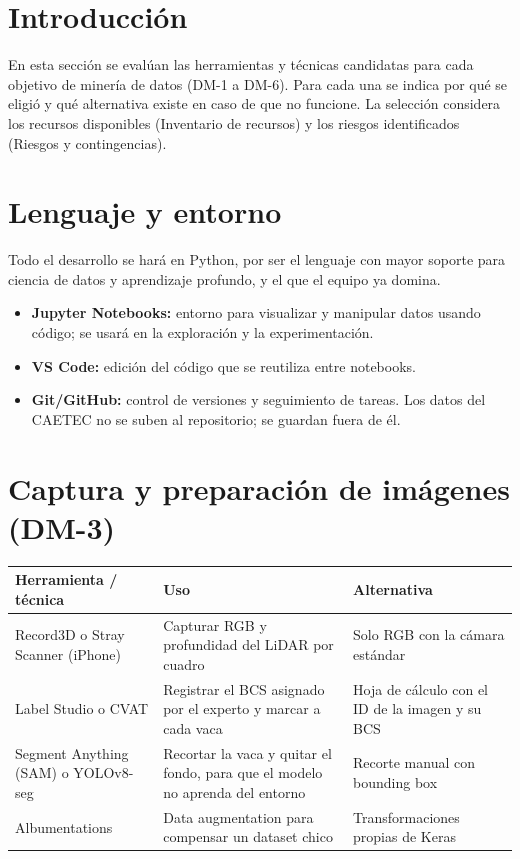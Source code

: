 \documentclass[11pt,letterpaper,DIV=12]{scrartcl}
\begin{document}


\section{Introducción}

En esta sección se evalúan las herramientas y técnicas candidatas para cada objetivo de minería de datos (DM-1 a DM-6). Para cada una se indica por qué se eligió y qué alternativa existe en caso de que no funcione. La selección considera los recursos disponibles (Inventario de recursos) y los riesgos identificados (Riesgos y contingencias).

\section{Lenguaje y entorno}

Todo el desarrollo se hará en Python, por ser el lenguaje con mayor soporte para ciencia de datos y aprendizaje profundo, y el que el equipo ya domina.

\begin{itemize}
  \item \textbf{Jupyter Notebooks:} entorno para visualizar y manipular datos usando código; se usará en la exploración y la experimentación.
  \item \textbf{VS Code:} edición del código que se reutiliza entre notebooks.
  \item \textbf{Git/GitHub:} control de versiones y seguimiento de tareas. Los datos del CAETEC no se suben al repositorio; se guardan fuera de él.
\end{itemize}

\section{Captura y preparación de imágenes (DM-3)}

\noindent
\begin{tabularx}{\textwidth}{>{\raggedright\arraybackslash}X>{\raggedright\arraybackslash}X>{\raggedright\arraybackslash}X}
  \toprule
  Herramienta / técnica & Uso & Alternativa \\
  \midrule
  Record3D o Stray Scanner (iPhone) & Capturar RGB y profundidad del LiDAR por cuadro & Solo RGB con la cámara estándar \\
  \addlinespace
  Label Studio o CVAT & Registrar el BCS asignado por el experto y marcar a cada vaca & Hoja de cálculo con el ID de la imagen y su BCS \\
  \addlinespace
  Segment Anything (SAM) o YOLOv8-seg & Recortar la vaca y quitar el fondo, para que el modelo no aprenda del entorno & Recorte manual con bounding box \\
  \addlinespace
  Albumentations & Data augmentation para compensar un dataset chico & Transformaciones propias de Keras \\
  \bottomrule
\end{tabularx}
\end{document}
